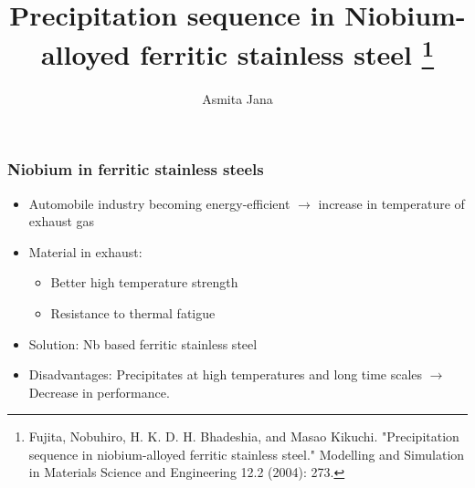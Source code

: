 \documentclass{beamer}
\begin{document}
\title[]{Precipitation sequence in Niobium-alloyed ferritic stainless steel \footnote{\footnotesize{Fujita, Nobuhiro, H. K. D. H. Bhadeshia, and Masao Kikuchi. "Precipitation sequence in niobium-alloyed ferritic stainless steel." Modelling and Simulation in Materials Science and Engineering 12.2 (2004): 273.} }}
\author{Asmita Jana \\
	}

\begin{frame}
\titlepage
\end{frame}


\begin{frame}
\frametitle{Niobium in ferritic stainless steels}

\begin{itemize}
\item Automobile industry becoming energy-efficient $\rightarrow$ increase in temperature of exhaust gas
\item Material in exhaust:
	\begin{itemize}
		\item Better high temperature strength
		\item Resistance to thermal fatigue
	\end{itemize}
\item Solution: Nb based ferritic stainless steel
\item Disadvantages: Precipitates at high temperatures and long time scales $\rightarrow$ Decrease in performance. 
\end{itemize}

\end{frame}

\end{document}
